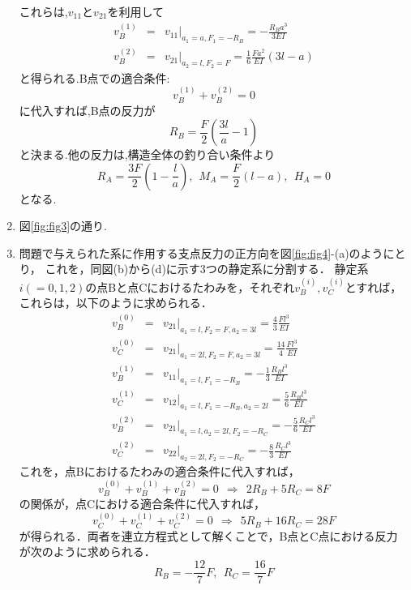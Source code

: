 \documentclass[10pt,a4j]{jarticle}
\begin{document}
\begin{enumerate}
	これらは,$v_{11}$と$v_{21}$を利用して
	\begin{eqnarray}
		v_B^{(1)} &=& \left. v_{11}\right|_{a_1=a, F_1=-R_B}= -\frac{R_Ba^3}{3EI}  \\
		v_B^{(2)} &=& \left. v_{21}\right|_{a_2=l, F_2=F}= \frac{1}{6}\frac{Fa^2}{EI}(3l-a)
	\end{eqnarray}
	と得られる.B点での適合条件:
	\begin{equation}
		v_B^{(1)}+v_B^{(2)}=0 
	\end{equation}
	に代入すれば,B点の反力が
	\begin{equation}
		R_B=\frac{F}{2}\left(\frac{3l}{a}-1\right)
	\end{equation}
	と決まる.他の反力は,構造全体の釣り合い条件より
	\begin{equation}
		R_A=\frac{3F}{2}\left(1-\frac{l}{a}\right), \ \ 
		M_A=\frac{F}{2}(l-a) ,\ \ H_A=0
		\label{eqn:}
	\end{equation}
	となる.
\item
	図\ref{fig:fig3}の通り.
\item
	問題で与えられた系に作用する支点反力の正方向を図\ref{fig:fig4}-(a)のようにとり，
	これを，同図(b)から(d)に示す3つの静定系に分割する．
	静定系$i(=0,1,2)$の点Bと点Cにおけるたわみを，それぞれ$v^{(i)}_B,v^{(i)}_C$とすれば，
	これらは，以下のように求められる．
	\begin{eqnarray}
		v_B^{(0)} &=& \left. v_{21}\right|_{a_1=l, F_2=F,a_2=3l}= \frac{4}{3}\frac{Fl^3}{EI} \\ 
		v_C^{(0)} &=& \left. v_{21}\right|_{a_1=2l, F_2=F, a_2=3l}= \frac{14}{4}\frac{Fl^3}{EI}\\
		v_B^{(1)} &=& \left. v_{11}\right|_{a_1=l, F_1=-R_B}= -\frac{1}{3}\frac{R_Bl^3}{EI} \\ 
		v_C^{(1)} &=& \left. v_{12}\right|_{a_1=l, F_1=-R_B, a_2=2l}= \frac{5}{6}\frac{R_Bl^3}{EI}\\
		v_B^{(2)} &=& \left. v_{21}\right|_{a_1=l, a_2=2l, F_2=-R_C}= -\frac{5}{6}\frac{R_Cl^3}{EI} \\ 
		v_C^{(2)} &=& \left. v_{22}\right|_{a_2=2l, F_2=-R_C}= -\frac{8}{3}\frac{R_Cl^3}{EI}
	\end{eqnarray}
	これを，点Bにおけるたわみの適合条件に代入すれば，
	\begin{equation}
		v_B^{(0)}+v_B^{(1)}+v_B^{(2)}=0 \ \ \Rightarrow \ \ 2R_B+5R_C=8F
		\label{eqn:}
	\end{equation}
	の関係が，点Cにおける適合条件に代入すれば，
	\begin{equation}
		v_C^{(0)}+v_C^{(1)}+v_C^{(2)}=0 \ \ \Rightarrow \ \ 5R_B+16R_C=28F
		\label{eqn:}
	\end{equation}
	が得られる．両者を連立方程式として解くことで，B点とC点における反力が次のように求められる．
	\begin{equation}
		R_B=-\frac{12}{7}F, \ \ R_C=\frac{16}{7}F
		\label{eqn:}
	\end{equation}
\end{enumerate}
\end{document}
